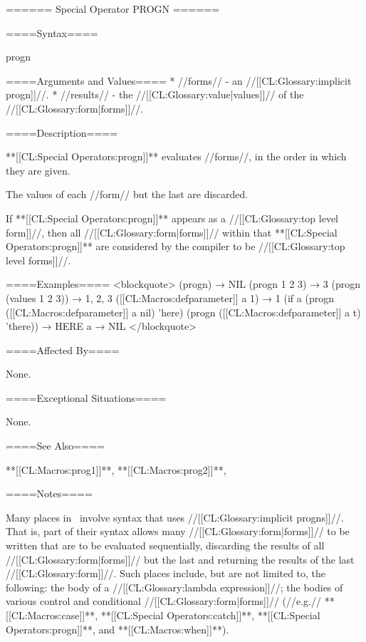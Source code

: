 ====== Special Operator PROGN ======

====Syntax====

\DefspecWithValues progn {} {}

====Arguments and Values====
  * //forms// - an //[[CL:Glossary:implicit progn]]//.
  * //results// - the //[[CL:Glossary:value|values]]// of the //[[CL:Glossary:form|forms]]//.

====Description====

**[[CL:Special Operators:progn]]** evaluates //forms//, in the order in which they are given.

The values of each //form// but the last are discarded.

If **[[CL:Special Operators:progn]]** appears as a //[[CL:Glossary:top level form]]//, then all //[[CL:Glossary:form|forms]]// within that **[[CL:Special Operators:progn]]** are considered by the compiler to be //[[CL:Glossary:top level forms]]//.

====Examples==== <blockquote> (progn) → NIL (progn 1 2 3) → 3 (progn (values 1 2 3)) → 1, 2, 3 ([[CL:Macros:defparameter]] a 1) → 1 (if a (progn ([[CL:Macros:defparameter]] a nil) 'here) (progn ([[CL:Macros:defparameter]] a t) 'there)) → HERE a → NIL </blockquote>

====Affected By====

None.

====Exceptional Situations====

None.

====See Also====

**[[CL:Macros:prog1]]**, **[[CL:Macros:prog2]]**, {\secref\Evaluation}

====Notes====

Many places in \clisp\ involve syntax that uses //[[CL:Glossary:implicit progns]]//. That is, part of their syntax allows many //[[CL:Glossary:form|forms]]// to be written that are to be evaluated sequentially, discarding the results of all //[[CL:Glossary:form|forms]]// but the last and returning the results of the last //[[CL:Glossary:form]]//. Such places include, but are not limited to, the following: the body of a //[[CL:Glossary:lambda expression]]//; the bodies of various control and conditional //[[CL:Glossary:form|forms]]// (//e.g.// **[[CL:Macros:case]]**, **[[CL:Special Operators:catch]]**, **[[CL:Special Operators:progn]]**, and **[[CL:Macros:when]]**).


